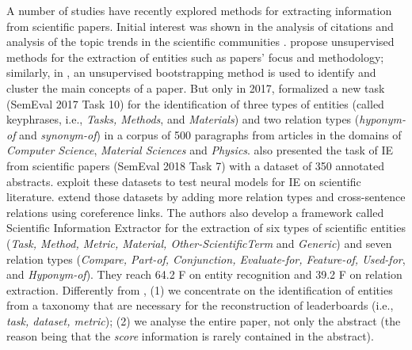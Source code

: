 \documentclass[11pt,a4paper]{article}
\begin{document}
A number of studies have recently explored methods for extracting information from scientific papers. 
Initial interest was shown in the analysis of citations \cite{athar-teufel:2012,athar-teufel:2012:DSSD,jurgens-etal-2018-measuring} and analysis of the topic trends in the scientific communities \cite{W12-3204}.   
\citet{gupta2011analyzing,GBOR16.870} propose unsupervised methods for the extraction of entities such as papers' focus and methodology; similarly, in \cite{Tsai:2013:}, an unsupervised bootstrapping method is used to identify and cluster the main concepts of a paper.
But only in 2017,  formalized a new task (SemEval 2017 Task 10) for the identification of three types of entities (called keyphrases, i.e., \textit{Tasks, Methods}, and \textit{Materials}) and two relation types (\textit{hyponym-of} and \textit{synonym-of}) in a corpus of 500 paragraphs from articles in the domains of \emph{Computer Science}, \emph{Material Sciences} and \emph{Physics}.  also presented the task of IE from scientific papers (SemEval 2018 Task 7) with a dataset of 350 annotated abstracts. 
 \citet{Ammar2017,Ammar2018,Luan2017,Augustein2017Acl} exploit these datasets to test neural models for IE on scientific literature.
\citet{Luan2018} extend those datasets by adding more relation types and cross-sentence relations using coreference links. The authors also develop a framework called Scientific Information Extractor for the extraction of six types of scientific entities (\textit{Task, Method, Metric, Material, Other-ScientificTerm} and \textit{Generic}) and seven relation types (\textit{Compare, Part-of, Conjunction, Evaluate-for, Feature-of, Used-for}, and \textit{Hyponym-of}). They reach 64.2 F on entity recognition and 39.2 F on relation extraction.
Differently from \cite{Luan2018}, (1) we concentrate on the identification of entities from a taxonomy that are necessary for the reconstruction of leaderboards (i.e., \textit{task, dataset, metric}); (2) we analyse the entire paper, not only the abstract (the reason being that the \textit{score} information is rarely contained in the abstract).
\end{document}
